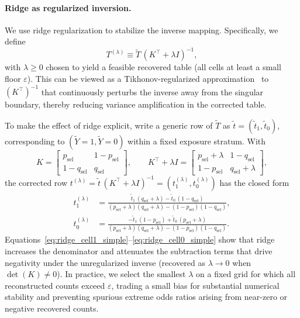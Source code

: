 \documentclass[pdflatex,sn-mathphys-num]{sn-jnl}%
\theoremstyle{thmstyleone}%
\theoremstyle{thmstyletwo}%
\theoremstyle{thmstylethree}%
\begin{document}
\paragraph{Ridge as regularized inversion.}
We use ridge regularization to stabilize the inverse mapping. Specifically, we define
\[
T^{(\lambda)} \equiv \tilde T\,(K^\top+\lambda I)^{-1},
\]
with $\lambda\ge 0$ chosen to yield a feasible recovered table (all cells at least a small floor $\varepsilon$). This can be viewed as a Tikhonov-regularized approximation~\cite{tikhonov1963regularization} to $(K^\top)^{-1}$ that continuously perturbs the inverse away from the singular boundary, thereby reducing variance amplification in the corrected table.

To make the effect of ridge explicit, write a generic row of $\tilde T$ as $\tilde t=(\tilde t_1,\tilde t_0)$, corresponding to $(\tilde Y=1,\tilde Y=0)$ within a fixed exposure stratum. With
\[
K=\begin{bmatrix}
p_{\mathrm{sel}} & 1-p_{\mathrm{sel}}\\
1-q_{\mathrm{sel}} & q_{\mathrm{sel}}
\end{bmatrix},
\qquad
K^\top+\lambda I=
\begin{bmatrix}
p_{\mathrm{sel}}+\lambda & 1-q_{\mathrm{sel}}\\
1-p_{\mathrm{sel}} & q_{\mathrm{sel}}+\lambda
\end{bmatrix},
\]
the corrected row $t^{(\lambda)}=\tilde t\,(K^\top+\lambda I)^{-1}=(t^{(\lambda)}_1,t^{(\lambda)}_0)$ has the closed form
\begin{align}
t^{(\lambda)}_1
&=\frac{\tilde t_1\,(q_{\mathrm{sel}}+\lambda)-\tilde t_0\,(1-q_{\mathrm{sel}})}
{(p_{\mathrm{sel}}+\lambda)(q_{\mathrm{sel}}+\lambda)-(1-p_{\mathrm{sel}})(1-q_{\mathrm{sel}})},\label{eq:ridge_cell1_simple}\\
t^{(\lambda)}_0
&=\frac{-\tilde t_1\,(1-p_{\mathrm{sel}})+\tilde t_0\,(p_{\mathrm{sel}}+\lambda)}
{(p_{\mathrm{sel}}+\lambda)(q_{\mathrm{sel}}+\lambda)-(1-p_{\mathrm{sel}})(1-q_{\mathrm{sel}})}.\label{eq:ridge_cell0_simple}
\end{align}
Equations~\eqref{eq:ridge_cell1_simple}--\eqref{eq:ridge_cell0_simple} show that ridge increases the denominator and attenuates the subtraction terms that drive negativity under the unregularized inverse (recovered as $\lambda\to 0$ when $\det(K)\neq 0$). In practice, we select the smallest $\lambda$ on a fixed grid for which all reconstructed counts exceed $\varepsilon$, trading a small bias for substantial numerical stability and preventing spurious extreme odds ratios arising from near-zero or negative recovered counts.
\end{document}
